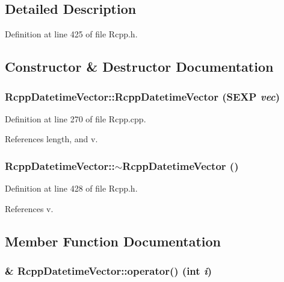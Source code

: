 \subsection{Detailed Description}


Definition at line 425 of file Rcpp.h.

\subsection{Constructor \& Destructor Documentation}
\hypertarget{classRcppDatetimeVector_1c1d1e2087fdc8e7601299dc2c4fe24c}{
\subsubsection[{RcppDatetimeVector}]{\setlength{\rightskip}{0pt plus 5cm}RcppDatetimeVector::RcppDatetimeVector (SEXP {\em vec})}}
\label{classRcppDatetimeVector_1c1d1e2087fdc8e7601299dc2c4fe24c}




Definition at line 270 of file Rcpp.cpp.

References length, and v.\hypertarget{classRcppDatetimeVector_81d6c5daba7448058a2f896841ddeb3a}{
\subsubsection[{$\sim$RcppDatetimeVector}]{\setlength{\rightskip}{0pt plus 5cm}RcppDatetimeVector::$\sim$RcppDatetimeVector ()}}
\label{classRcppDatetimeVector_81d6c5daba7448058a2f896841ddeb3a}




Definition at line 428 of file Rcpp.h.

References v.

\subsection{Member Function Documentation}
\hypertarget{classRcppDatetimeVector_2ffa33b5231a7975652e1e2498d0e16a}{
\subsubsection[{operator()}]{\& RcppDatetimeVector::operator() (int {\em i})}}
\label{classRcppDatetimeVector_2ffa33b5231a7975652e1e2498d0e16a}




